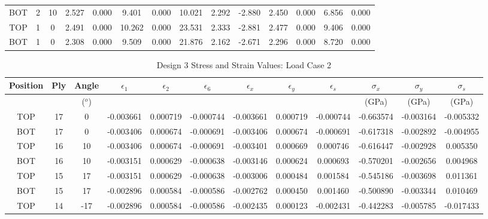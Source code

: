 \begin{landscape}
\begin{table}
\begin{tabular}{|ccc|ccccc|cc|cccc|}
BOT &  2 &  10 &   2.527 &   0.000 &   9.401 &   0.000 & 10.021 & 2.292 & -2.880 &    2.450 &    0.000 &    6.856 &    0.000 \\
TOP &  1 &   0 &   2.491 &   0.000 &  10.262 &   0.000 & 23.531 & 2.333 & -2.881 &    2.477 &    0.000 &    9.406 &    0.000 \\
BOT &  1 &   0 &   2.308 &   0.000 &   9.509 &   0.000 & 21.876 & 2.162 & -2.671 &    2.296 &    0.000 &    8.720 &    0.000 \\
\bottomrule
\end{tabular}
\end{table}
\end{landscape}


\begin{landscape}
\begin{table}
\centering
\caption{Design 3 Stress and Strain Values: Load Case 2}
\label{tab:q3stress2}
\begin{tabular}{|ccc|ccc|ccc|ccc|}
\toprule
Position &  Ply &  Angle & $\epsilon_{1}$ & $\epsilon_{2}$ & $\epsilon_{6}$ & $\epsilon_{x}$ & $\epsilon_{y}$ & $\epsilon_{s}$ & $\sigma_{x}$ & $\sigma_{y}$ & $\sigma_{s}$ \\
\midrule
 & & ($^{o}$) & & & & & & & (GPa) & (GPa) & (GPa) \\
\midrule
TOP &   17 &      0 & -0.003661 &  0.000719 & -0.000744 & -0.003661 &  0.000719 & -0.000744 &      -0.663574 &      -0.003164 &      -0.005332 \\
BOT &   17 &      0 & -0.003406 &  0.000674 & -0.000691 & -0.003406 &  0.000674 & -0.000691 &      -0.617318 &      -0.002892 &      -0.004955 \\
TOP &   16 &     10 & -0.003406 &  0.000674 & -0.000691 & -0.003401 &  0.000669 &  0.000746 &      -0.616447 &      -0.002928 &       0.005350 \\
BOT &   16 &     10 & -0.003151 &  0.000629 & -0.000638 & -0.003146 &  0.000624 &  0.000693 &      -0.570201 &      -0.002656 &       0.004968 \\
TOP &   15 &     17 & -0.003151 &  0.000629 & -0.000638 & -0.003006 &  0.000484 &  0.001584 &      -0.545186 &      -0.003698 &       0.011361 \\
BOT &   15 &     17 & -0.002896 &  0.000584 & -0.000586 & -0.002762 &  0.000450 &  0.001460 &      -0.500890 &      -0.003344 &       0.010469 \\
TOP &   14 &    -17 & -0.002896 &  0.000584 & -0.000586 & -0.002435 &  0.000123 & -0.002431 &      -0.442283 &      -0.005785 &      -0.017433 \\

\end{tabular}
\end{table}
\end{landscape}

